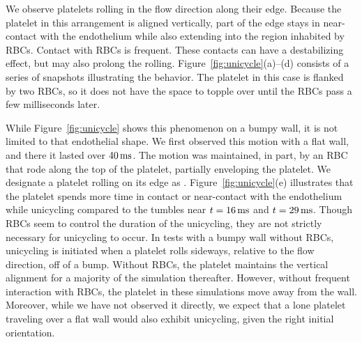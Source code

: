 We observe platelets rolling in the flow direction along their edge. Because the
platelet in this arrangement is aligned vertically, part of the edge stays in
near-contact with the endothelium while also extending into the region inhabited by RBCs.
Contact with RBCs is frequent. These contacts can have a destabilizing effect, but may
also prolong the rolling. Figure~\ref{fig:unicycle}(a)--(d) consists of a series of
snapshots illustrating the behavior. The platelet in this case is flanked by two RBCs, so
it does not have the space to topple over until the RBCs pass a few milliseconds later.

While Figure~\ref{fig:unicycle} shows this phenomenon on a bumpy wall, it is not limited
to that endothelial shape. We first observed this motion with a flat wall, and there it
lasted over $40\ms$. The motion was maintained, in part, by an RBC that rode along
the top of the platelet, partially enveloping the platelet. We designate a platelet
rolling on its edge as . Figure~\ref{fig:unicycle}(e) illustrates that
the platelet spends more time in contact or near-contact with the endothelium while
unicycling compared to the tumbles near $t=16\ms$ and $t=29\ms$. Though RBCs seem to
control the duration of the unicycling, they are not strictly necessary for unicycling to
occur. In tests with a bumpy wall without RBCs, unicycling is initiated when a platelet
rolls sideways, relative to the flow direction, off of a bump. Without RBCs, the platelet
maintains the vertical alignment for a majority of the simulation thereafter. However,
without frequent interaction with RBCs, the platelet in these simulations move away from
the wall.  Moreover, while we have not observed it directly, we expect that a lone
platelet traveling over a flat wall would also exhibit unicycling, given the right
initial orientation.

